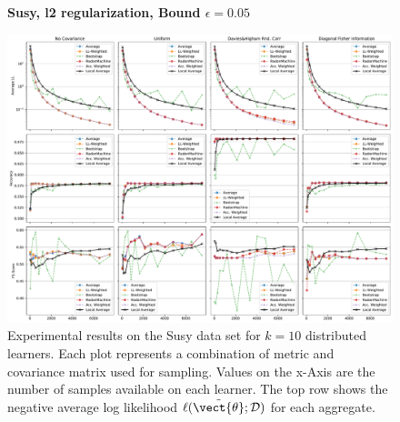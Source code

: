 \begin{landscape}
    \begin{figure}
        \centering
        \textbf{Susy, l2 regularization, Bound $\epsilon=0.05$}\par\medskip
        \includegraphics[height=\dimexpr \textheight - 1\baselineskip\relax]{kapitel/figures/susy_l2_0.05.pdf}
        \caption[Susy plots with l2 regularization and $\epsilon=0.05$]{Experimental results on the Susy data set for $k=10$ distributed learners. Each plot represents a combination of metric and covariance matrix used for sampling. Values on the x-Axis are the number of samples available on each learner. The top row shows the negative average log likelihood $\ell(\tilde{\vect{\theta}}; \mathcal{D})$ for each aggregate.}
        \label{fig:analysis1}
    \end{figure}
    \end{landscape}
